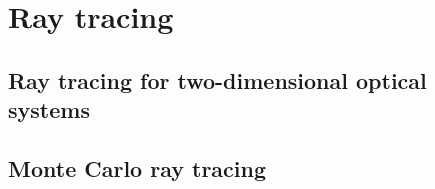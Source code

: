 \chapter{Ray tracing}
\section{Ray tracing for two-dimensional optical systems}
\section{Monte Carlo ray tracing}
